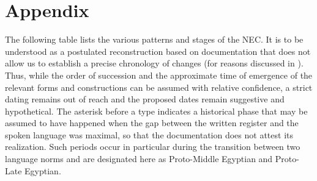 \documentclass[output=paper,draft,draftmode,colorlinks,citecolor=brown]{langscibook}
\begin{document}

\section*{Appendix}

The following table lists the various patterns and stages of the NEC. It is to be understood as a postulated reconstruction based on documentation that does not allow us to establish a precise chronology of changes (for reasons discussed in ). Thus, while the order of succession and the approximate time of emergence of the relevant forms and constructions can be assumed with relative confidence, a strict dating remains out of reach and the proposed dates remain suggestive and hypothetical. The asterisk before a type indicates a historical phase that may be assumed to have happened when the gap between the written register and the spoken language was maximal, so that the documentation does not attest its realization. Such periods occur in particular during the transition between two language norms and are designated here as Proto-Middle Egyptian and Proto-Late Egyptian.

\clearpage
\end{document}
